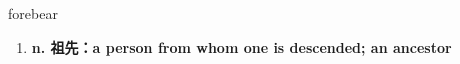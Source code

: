 
\begin{frame}
{\huge forebear}
\begin{center}
\begin{enumerate}\Large
  \item \textbf{n. 祖先：a person from whom one is descended; an ancestor}
\end{enumerate}
\end{center}
\end{frame}
